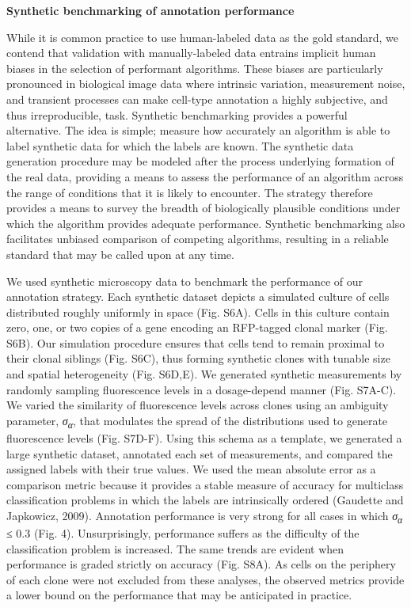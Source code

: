 \textbf{Synthetic benchmarking of annotation performance}

While it is common practice to use human-labeled data as the gold standard, we contend that validation with manually-labeled data entrains implicit human biases in the selection of performant algorithms. These biases are particularly pronounced in biological image data where intrinsic variation, measurement noise, and transient processes can make cell-type annotation a highly subjective, and thus irreproducible, task. Synthetic benchmarking provides a powerful alternative. The idea is simple; measure how accurately an algorithm is able to label synthetic data for which the labels are known. The synthetic data generation procedure may be modeled after the process underlying formation of the real data, providing a means to assess the performance of an algorithm across the range of conditions that it is likely to encounter. The strategy therefore provides a means to survey the breadth of biologically plausible conditions under which the algorithm provides adequate performance. Synthetic benchmarking also facilitates unbiased comparison of competing algorithms, resulting in a reliable standard that may be called upon at any time.

We used synthetic microscopy data to benchmark the performance of our annotation strategy. Each synthetic dataset depicts a simulated culture of cells distributed roughly uniformly in space (Fig. S6A). Cells in this culture contain zero, one, or two copies of a gene encoding an RFP-tagged clonal marker (Fig. S6B). Our simulation procedure ensures that cells tend to remain proximal to their clonal siblings (Fig. S6C), thus forming synthetic clones with tunable size and spatial heterogeneity (Fig. S6D,E). We generated synthetic measurements by randomly sampling fluorescence levels in a dosage-depend manner (Fig. S7A-C). We varied the similarity of fluorescence levels across clones using an ambiguity parameter, \emph{σ\textsubscript{α}}, that modulates the spread of the distributions used to generate fluorescence levels (Fig. S7D-F). Using this schema as a template, we generated a large synthetic dataset, annotated each set of measurements, and compared the assigned labels with their true values. We used the mean absolute error as a comparison metric because it provides a stable measure of accuracy for multiclass classification problems in which the labels are intrinsically ordered (Gaudette and Japkowicz, 2009). Annotation performance is very strong for all cases in which \emph{σ\textsubscript{α}} ≤ 0.3 (Fig. 4). Unsurprisingly, performance suffers as the difficulty of the classification problem is increased. The same trends are evident when performance is graded strictly on accuracy (Fig. S8A). As cells on the periphery of each clone were not excluded from these analyses, the observed metrics provide a lower bound on the performance that may be anticipated in practice.

